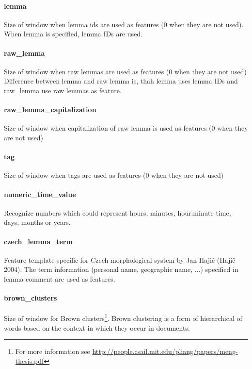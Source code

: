 \paragraph{lemma}
Size of window when lemma ids are used as features (0 when they are not used).
When lemma is specified, lemma IDs are used.

\paragraph{raw\_lemma}
Size of window when raw lemmas are used as features (0 when they are not used)
Difference between lemma and raw lemma is, thah lemma uses lemma IDs and raw\_lemma use raw lemmas as feature.

\paragraph{raw\_lemma\_capitalization}
Size of window when capitalization of raw lemma is used as features (0 when they are not used)

\paragraph{tag}
Size of window when tags are used as features (0 when they are not used)

\paragraph{numeric\_time\_value}
Recognize numbers which could represent hours, minutes, hour:minute time, days,
months or years.

\paragraph{czech\_lemma\_term}
Feature template specific for Czech morphological system by Jan Hajič (Hajič 2004).
The term information (personal name, geographic name, ...) specified in lemma comment
are used as features.

\paragraph{brown\_clusters}
Size of window for Brown clusters\footnote{For more information see
\url{http://people.csail.mit.edu/pliang/papers/meng-thesis.pdf}}.
Brown clustering is a form of hierarchical of words based on the context in
which they occur in documents.

